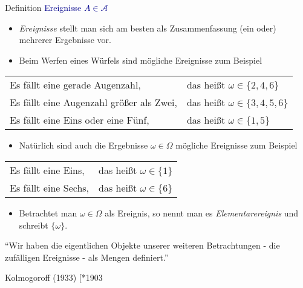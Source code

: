 \documentclass[
  8pt,
  ignorenonframetext,
]{beamer}
\providecommand{\tightlist}{%
  \setlength{\itemsep}{0pt}\setlength{\parskip}{0pt}}
\begin{document}
\begin{frame}{Definition}
\protect\hypertarget{definition-4}{}
\textcolor{darkblue}{Ereignisse $A \in \mathcal{A}$} \small
{}

\begin{itemize}
\tightlist
\item
  \emph{Ereignisse} stellt man sich am besten als Zusammenfassung (ein
  oder) mehrerer Ergebnisse vor.
\item
  Beim Werfen eines Würfels sind mögliche Ereignisse zum Beispiel
\end{itemize}

\begin{center}
\begin{tabular}{ll}
Es fällt eine gerade Augenzahl,          & das heißt $\omega \in \{2,4,6\}$      \\
Es fällt eine Augenzahl größer als Zwei, & das heißt $\omega \in \{3,4,5,6\}$   \\
Es fällt eine Eins oder eine Fünf,       & das heißt $\omega \in \{1,5\}$
\end{tabular}
\end{center}

\begin{itemize}
\tightlist
\item
  Natürlich sind auch die Ergebnisse \(\omega \in \Omega\) mögliche
  Ereignisse zum Beispiel
\end{itemize}

\begin{center}
\begin{tabular}{ll}
Es fällt eine Eins,                      & das heißt $\omega \in \{1\}$          \\
Es fällt eine Sechs,                     & das heißt $\omega \in \{6\}$          \\
\end{tabular}
\end{center}

\begin{itemize}
\tightlist
\item
  Betrachtet man \(\omega \in \Omega\) als Ereignis, so nennt man es
  \emph{Elementarereignis} und schreibt \(\{\omega\}\).
\end{itemize}

\footnotesize

``Wir haben die eigentlichen Objekte unserer weiteren Betrachtungen -
die zufälligen Ereignisse - als Mengen definiert.''

\flushright

Kolmogoroff (1933) {[}*1903 \textdagger 1987{]}
\end{frame}
\end{document}
